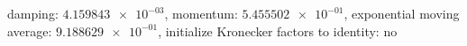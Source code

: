damping: $\num[scientific-notation=true]{4.159843e-03}$, momentum: $\num[scientific-notation=true]{5.455502e-01}$, exponential moving average: $\num[scientific-notation=true]{9.188629e-01}$, initialize Kronecker factors to identity: $\text{no}$
